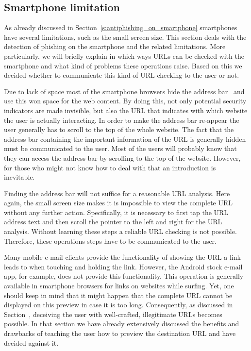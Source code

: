 \subsection{Smartphone limitation}
As already discussed in Section~\ref{s:antiphishing_on_smartphone} smartphones have several limitations, such as the small screen size. 
This section deals with the detection of phishing on the smartphone and the related limitations.
More particularly, we will briefly explain in which ways URLs can be checked with the smartphone and what kind of problems these operations raise.
Based on this we decided whether to communicate this kind of URL checking to the user or not.

\begin{description}[leftmargin=0cm]
	\item[Invisible Address Bar] Due to lack of space most of the smartphone browsers hide the address bar~\cite{amrutkar2012measuring} and use this won space for the web content. 
By doing this, not only potential security indicators are made invisible, but also the URL that indicates with which website the user is actually interacting.
In order to make the address bar re-appear the user generally has to scroll to the top of the whole website.
The fact that the address bar containing the important information of the URL is generally hidden must be communicated to the user.
Most of the users will probably know that they can access the address bar by scrolling to the top of the website.
However, for those who might not know how to deal with that an introduction is inevitable.

	\item[Analyze Complete URL Via Address Bar] Finding the address bar will not suffice for a reasonable URL analysis. 
Here again, the small screen size makes it is impossible to view the complete URL without any further action.
Specifically, it is necessary to first tap the URL address text and then scroll the pointer to the left and right for the URL analysis.
Without learning these steps a reliable URL checking is not possible. 
Therefore, these operations steps have to be communicated to the user.

	\item[Show URL Before Click] Many mobile e-mail clients provide the functionality of showing the URL a link leads to when touching and holding the link.
However, the Android stock e-mail app, for example, does not provide this functionality.
This operation is generally available in smartphone browsers for links on websites while surfing.
Yet, one should keep in mind that it might happen that the complete URL cannot be displayed on this preview in case it is too long. 
Consequently, as discussed in Section~\cite{s:coverage}, deceiving the user with well-crafted, illegitimate URLs becomes possible. 
In that section we have already extensively discussed the benefits and drawbacks of teaching the user how to preview the destination URL and have decided against it.


\end{description}
